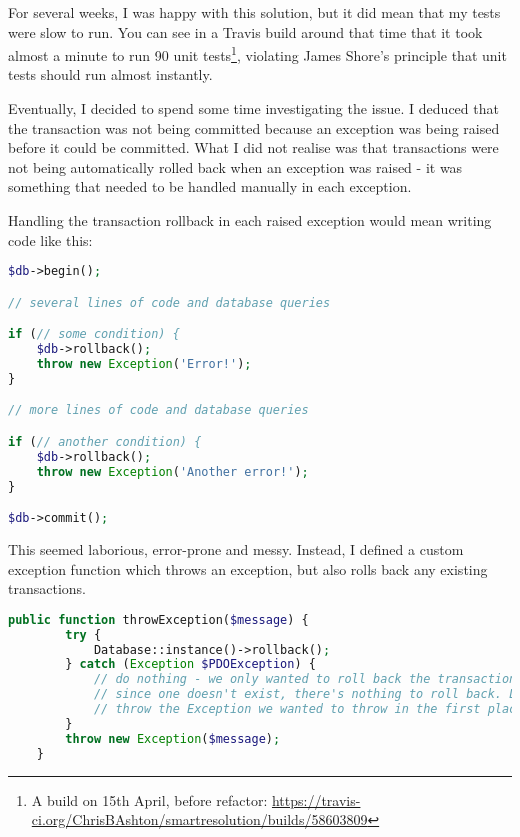 For several weeks, I was happy with this solution, but it did mean that my tests were slow to run. You can see in a Travis build around that time that it took almost a minute to run 90 unit tests\footnote{A build on 15th April, before refactor: \url{https://travis-ci.org/ChrisBAshton/smartresolution/builds/58603809}}, violating James Shore's principle that unit tests should run almost instantly.

Eventually, I decided to spend some time investigating the issue. I deduced that the transaction was not being committed because an exception was being raised before it could be committed. What I did not realise was that transactions were not being automatically rolled back when an exception was raised - it was something that needed to be handled manually in each exception.

Handling the transaction rollback in each raised exception would mean writing code like this:

\begin{minipage}{\textwidth}
\begin{lstlisting}[language=php]
$db->begin();

// several lines of code and database queries

if (// some condition) {
    $db->rollback();
    throw new Exception('Error!');
}

// more lines of code and database queries

if (// another condition) {
    $db->rollback();
    throw new Exception('Another error!');
}

$db->commit();
\end{lstlisting}
\end{minipage}

This seemed laborious, error-prone and messy. Instead, I defined a custom exception function which throws an exception, but also rolls back any existing transactions.

\begin{minipage}{\textwidth}
\begin{lstlisting}[language=php]
    public function throwException($message) {
        try {
            Database::instance()->rollback();
        } catch (Exception $PDOException) {
            // do nothing - we only wanted to roll back the transaction if one existed.
            // since one doesn't exist, there's nothing to roll back. Let's just continue and
            // throw the Exception we wanted to throw in the first place.
        }
        throw new Exception($message);
    }
\end{lstlisting}
\end{minipage}


